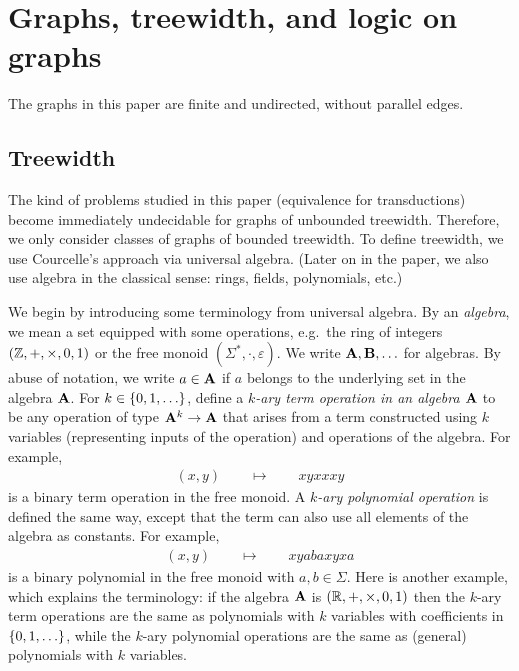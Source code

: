 \section{Graphs, treewidth, and logic on graphs}
The graphs in this paper are finite and undirected, without  parallel edges. 

\subsection{Treewidth}
\label{sec:treewidth-definition}
The kind of problems studied in this paper (equivalence for \mso transductions) become immediately undecidable for graphs of unbounded treewidth. Therefore, we  only consider classes of graphs of bounded treewidth.  To define treewidth, we use Courcelle's  approach via universal algebra. (Later on in the paper, we also use algebra in the classical sense: rings, fields, polynomials, etc.)


 We begin by introducing some terminology from universal algebra. By an \emph{algebra}, we mean a set equipped with some  operations, e.g.~the ring of integers $(\mathbb Z, + , \times, 0, 1)$ or the free monoid $(\Sigma^*, \cdot, \varepsilon)$. We write $\mathbf{A}, \mathbf{B}, \ldots$ for algebras. By abuse of notation, we write $a \in \mathbf{A}$ if $a$ belongs to the underlying set in the algebra $\mathbf{A}$. 
        For $k \in \{0,1,\ldots\}$, define a \emph{$k$-ary term operation in an algebra $\mathbf{A}$} to be  any operation of type $\mathbf{A}^k \to \mathbf{A}$ that arises from a term constructed using $k$ variables (representing inputs of the operation) and operations of the algebra. For example, 
        \begin{align*}
        (x,y) \qquad \mapsto \qquad xyxxxy
        \end{align*}
        is a binary term operation in the free monoid. 
        A \emph{$k$-ary polynomial operation} is defined the same way, except that the term can also use all elements of the algebra as constants.  For example, 
        \begin{align*}
        (x,y) \qquad \mapsto \qquad  xyabaxyxa
        \end{align*}
        is a binary polynomial in the free monoid with $a,b \in \Sigma$. Here is another example, which explains the terminology: if  the algebra $\mathbf{A}$ is 
        $
        (\mathbb R, + , \times, 0 ,1)
        $
        then the $k$-ary term operations are the same as polynomials with $k$ variables with coefficients in $\{0,1,\ldots\}$, while the $k$-ary polynomial operations are the same as (general) polynomials with $k$ variables.

